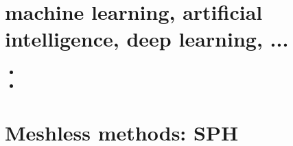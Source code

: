 \section{machine learning, artificial intelligence, deep learning, ...}

\begin{small}
\begin{itemize}
\item[\twothousandtwentyone] 
\item[\twothousandtwentythree] 
\end{itemize}
\end{small}



\section{Meshless methods: SPH}

